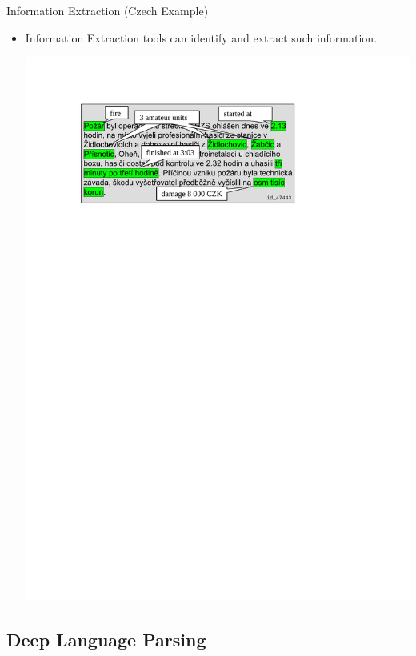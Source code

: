 \documentclass[xcolor=dvipsnames]{beamer}
\begin{document}
\begin{frame}{Information Extraction (Czech Example)}  
\begin{itemize}
	\item Information Extraction tools can identify and extract such information.
	\bigskip	
	\begin{center}
	\includegraphics[width=0.75\hsize]{img/fireman_annotated}
	\end{center}	
\end{itemize}
\end{frame}

\subsection{Deep Language Parsing} 
\frame{\tableofcontents[currentsubsection]}
\end{document}
